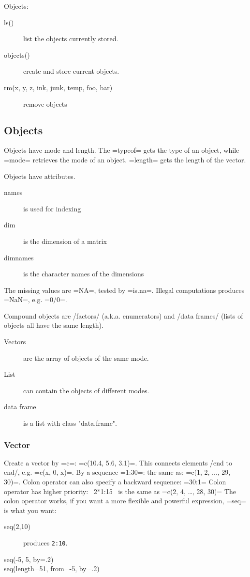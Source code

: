 Objects:
\begin{description}
\item [ls()] list the objects currently stored.
\item [objects()] create and store current objects.
\item [rm(x, y, z, ink, junk, temp, foo, bar)] remove objects
\end{description}


\subsection{Objects}
Objects have mode and length.  The =typeof= gets the type of an
object, while =mode= retrieves the mode of an object.  =length= gets
the length of the vector.

Objects have attributes.
\begin{description}
\item [names] is used for indexing
\item [dim] is the dimension of a matrix
\item [dimnames] is the character names of the dimensions
\end{description}

The missing values are =NA=, tested by =is.na=.  Illegal computations
produces =NaN=, e.g. =0/0=.

Compound objects are /factors/ (a.k.a. enumerators) and /data
frames/ (lists of objects all have the same length).
\begin{description}
\item [Vectors] are the array of objects of the same mode.
\item [List] can contain the objects of different modes.
\item [data frame] is a list with class "data.frame".
\end{description}

\subsubsection{Vector}
Create a vector by =c=: =c(10.4, 5.6, 3.1)=.
This connects elements /end to end/, e.g. =c(x, 0, x)=.
By a sequence =1:30=: the same as: =c(1, 2, ..., 29, 30)=.
Colon operator can also specify a backward sequence: =30:1=
Colon operator has higher priority: ~2*1:15~ is the same as =c(2, 4, …, 28, 30)=
The colon operator works, if you want a more flexible and powerful
expression, =seq= is what you want:
\begin{description}
\item [seq(2,10)] produces \texttt{2:10}.
\item [seq(-5, 5, by=.2)]
\item [seq(length=51, from=-5, by=.2)]
\end{description}

